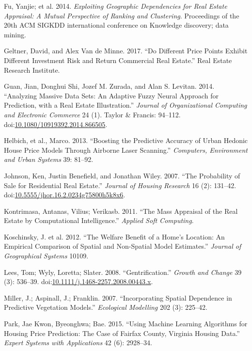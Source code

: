 \documentclass[]{article}
\begin{document}
\hypertarget{ref-Fu2014}{}
Fu, Yanjie; et al. 2014. \emph{Exploiting Geographic Dependencies for
Real Estate Appraisal: A Mutual Perspective of Ranking and Clustering}.
Proceedings of the 20th ACM SIGKDD international conference on Knowledge
discovery; data mining.

\hypertarget{ref-Geltner2017}{}
Geltner, David, and Alex Van de Minne. 2017. ``Do Different Price Points
Exhibit Different Investment Risk and Return Commercial Real Estate.''
Real Estate Research Institute.

\hypertarget{ref-Guan2014}{}
Guan, Jian, Donghui Shi, Jozef M. Zurada, and Alan S. Levitan. 2014.
``Analyzing Massive Data Sets: An Adaptive Fuzzy Neural Approach for
Prediction, with a Real Estate Illustration.'' \emph{Journal of
Organizational Computing and Electronic Commerce} 24 (1). Taylor \&
Francis: 94--112.
doi:\href{https://doi.org/10.1080/10919392.2014.866505}{10.1080/10919392.2014.866505}.

\hypertarget{ref-Helbich2013}{}
Helbich, et al., Marco. 2013. ``Boosting the Predictive Accuracy of
Urban Hedonic House Price Models Through Airborne Laser Scanning.''
\emph{Computers, Environment and Urban Systems} 39: 81--92.

\hypertarget{ref-Johnson2007}{}
Johnson, Ken, Justin Benefield, and Jonathan Wiley. 2007. ``The
Probability of Sale for Residential Real Estate.'' \emph{Journal of
Housing Research} 16 (2): 131--42.
doi:\href{https://doi.org/10.5555/jhor.16.2.0234g75800h5k8x6}{10.5555/jhor.16.2.0234g75800h5k8x6}.

\hypertarget{ref-Kontrimasa2011}{}
Kontrimasa, Antanas, Vilius; Verikasb. 2011. ``The Mass Appraisal of the
Real Estate by Computational Intelligence.'' \emph{Applied Soft
Computing}.

\hypertarget{ref-Koschinsky2012}{}
Koschinsky, J. et al. 2012. ``The Welfare Benefit of a Home's Location:
An Empirical Comparison of Spatial and Non-Spatial Model Estimates.''
\emph{Journal of Geographical Systems} 10109.

\hypertarget{ref-Lees2008}{}
Lees, Tom; Wyly, Loretta; Slater. 2008. ``Gentrification.'' \emph{Growth
and Change} 39 (3): 536--39.
doi:\href{https://doi.org/10.1111/j.1468-2257.2008.00443.x}{10.1111/j.1468-2257.2008.00443.x}.

\hypertarget{ref-Miller2015}{}
Miller, J.; Aspinall, J.; Franklin. 2007. ``Incorporating Spatial
Dependence in Predictive Vegetation Models.'' \emph{Ecological
Modelling} 202 (3): 225--42.

\hypertarget{ref-Park2015}{}
Park, Jae Kwon, Byeonghwa; Bae. 2015. ``Using Machine Learning
Algorithms for Housing Price Prediction: The Case of Fairfax County,
Virginia Housing Data.'' \emph{Expert Systems with Applications} 42 (6):
2928--34.
\end{document}
